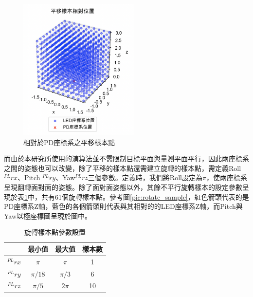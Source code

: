 \begin{figure}[htpb]
    \centering
    \includegraphics[width=6cm]{ch4pic/translate_sample.png}
    \caption{相對於PD座標系之平移樣本點}
    \label{pic:translate_sample}
\end{figure}

而由於本研究所使用的演算法並不需限制目標平面與量測平面平行，因此兩座標系之間的姿態也可以改變，除了平移的樣本點還需建立旋轉的樣本點，需定義Roll $^{PL}rx$、Pitch $^{PL}ry$、Yaw$^{PL}rz$三個參數。定義時，我們將Roll設定為$\pi$，使兩座標系呈現翻轉面對面的姿態。除了面對面姿態以外，其餘不平行旋轉樣本的設定參數呈現於表\ref{tab:rotate}中，共有61個旋轉樣本點。參考圖\ref{pic:rotate_sample}，紅色箭頭代表的是PD座標系Z軸，藍色的各個箭頭則代表與其相對的的LED座標系Z軸，而Pitch與Yaw以極座標圖呈現於圖中。



\begin{table}[htpb]
    \begin{center}
      \caption{旋轉樣本點參數設置}
      \label{tab:rotate}
      \begin{tabular}{c|c|c|c} %
        & \textbf{最小值} & \textbf{最大值}&\textbf{樣本數}\\
       \hline
       $^{PL}rx$ & $\pi$ & $\pi$&1\\
       $^{PL}ry$ & $\pi/18$ &$\pi/3$&6\\
       $^{PL}rz$ & $\pi/5$ & $2\pi$&10\\
     \end{tabular}
   \end{center}
 \end{table}

